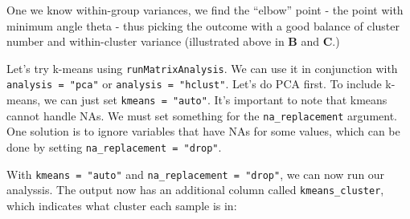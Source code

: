 \documentclass[
]{krantz}
\begin{document}
One we know within-group variances, we find the ``elbow'' point - the point with minimum angle theta - thus picking the outcome with a good balance of cluster number and within-cluster variance (illustrated above in \textbf{B} and \textbf{C}.)

Let's try k-means using \texttt{runMatrixAnalysis}. We can use it in conjunction with \texttt{analysis\ =\ "pca"} or \texttt{analysis\ =\ "hclust"}. Let's do PCA first. To include k-means, we can just set \texttt{kmeans\ =\ "auto"}. It's important to note that kmeans cannot handle NAs. We must set something for the \texttt{na\_replacement} argument. One solution is to ignore variables that have NAs for some values, which can be done by setting \texttt{na\_replacement\ =\ "drop"}.

With \texttt{kmeans\ =\ "auto"} and \texttt{na\_replacement\ =\ "drop"}, we can now run our analyssis. The output now has an additional column called \texttt{kmeans\_cluster}, which indicates what cluster each sample is in:
\end{document}
